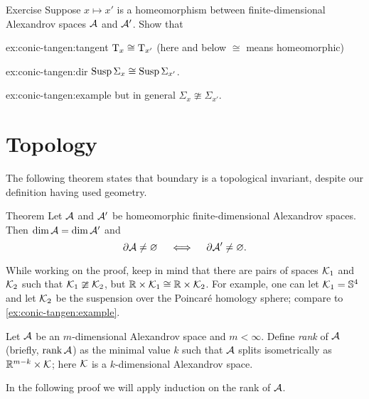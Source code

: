 \begin{thm}{Exercise}\label{ex:conic-tangent}
Suppose $x\mapsto x'$ is a homeomorphism between finite-dimensional Alexandrov spaces $\mathcal{A}$ and $\mathcal{A}'$. Show that 

\begin{subthm}{ex:conic-tangen:tangent}
$\mathrm{T}_x\cong \mathrm{T}_{x'}$ (here and below $\cong $ means homeomorphic) 
\end{subthm}

\begin{subthm}{ex:conic-tangen:dir}
$\mathop{\rm Susp}\nolimits\Sigma_x\cong \mathop{\rm Susp}\nolimits\Sigma_{x'}$.
\end{subthm}

\begin{subthm}{ex:conic-tangen:example}
but in general $\Sigma_x\ncong\Sigma_{x'}$.
\end{subthm}

\end{thm}



\section{Topology}

The following theorem states that boundary is a topological invariant, despite our definition having used geometry.

\begin{thm}{Theorem}\label{thm:top-bry}
Let $\mathcal{A}$ and $\mathcal{A}'$ be homeomorphic finite-dimensional Alexandrov spaces.
Then $\operatorname{\rm dim}\nolimits \mathcal{A}=\operatorname{\rm dim}\nolimits\mathcal{A}'$ and
\[\partial\mathcal{A}\ne \varnothing
\quad\iff\quad
\partial\mathcal{A}'\ne \varnothing.
\]
\end{thm}

While working on the proof, keep in mind that there are pairs of spaces $\mathcal{K}_1$ and $\mathcal{K}_2$ such that $\mathcal{K}_1\ncong \mathcal{K}_2$, but $\mathbb{R}\times \mathcal{K}_1\cong \mathbb{R}\times \mathcal{K}_2$.
For example, one can let $\mathcal{K}_1=\mathbb{S}^4$ and let $\mathcal{K}_2$ be the suspension over the Poincaré homology sphere; compare to \ref{ex:conic-tangen:example}.

Let $\mathcal{A}$ be an $m$-dimensional Alexandrov space and $m<\infty$.
Define \emph{rank} of $\mathcal{A}$ (briefly, $\operatorname{\rm rank}\nolimits\mathcal{A}$) as the minimal value $k$ such that $\mathcal{A}$ splits isometrically as $\mathbb{R}^{m-k}\times \mathcal{K}$;
here $\mathcal{K}$ is a $k$-dimensional Alexandrov space.

In the following proof we will apply induction on the rank of $\mathcal{A}$.



